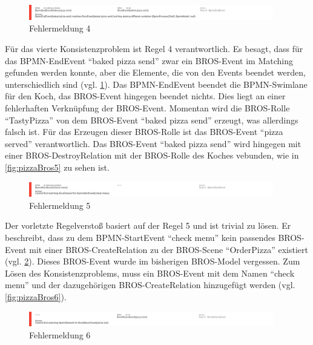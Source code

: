 \begin{figure}[H]
    \centering
    \includegraphics[width=0.95\textwidth,keepaspectratio]{../images/example/error4.png}%
    \caption{Fehlermeldung 4}%
    \label{fig:error4}
\end{figure}

Für das vierte Konsistenzproblem ist Regel 4 verantwortlich.
Es besagt, dass für das BPMN-EndEvent ``baked pizza send'' zwar ein BROS-Event im Matching gefunden werden konnte, aber die Elemente, die von den Events beendet werden, unterschiedlich sind (vgl. \cref{fig:error4}).
Das BPMN-EndEvent beendet die BPMN-Swimlane für den Koch, das BROS-Event hingegen beendet nichts.
Dies liegt an einer fehlerhaften Verknüpfung der BROS-Event.
Momentan wird die BROS-Rolle ``TastyPizza'' von dem BROS-Event ``baked pizza send'' erzeugt, was allerdings falsch ist.
Für das Erzeugen dieser BROS-Rolle ist das BROS-Event ``pizza served'' verantwortlich.
Das BROS-Event ``baked pizza send'' wird hingegen mit einer BROS-DestroyRelation mit der BROS-Rolle des Koches vebunden, wie in \cref{fig:pizzaBros5} zu sehen ist.

\begin{figure}[H]
    \centering
    \includegraphics[width=0.95\textwidth,keepaspectratio]{../images/example/error5.png}%
    \caption{Fehlermeldung 5}%
    \label{fig:error5}
\end{figure}

Der vorletzte Regelverstoß basiert auf der Regel 5 und ist trivial zu lösen.
Er beschreibt, dass zu dem BPMN-StartEvent ``check menu'' kein passendes BROS-Event mit einer BROS-CreateRelation zu der BROS-Scene ``OrderPizza'' existiert (vgl. \cref{fig:error5}).
Dieses BROS-Event wurde im bisherigen BROS-Model vergessen.
Zum Lösen des Konsistenzproblems, muss ein BROS-Event mit dem Namen ``check menu'' und der dazugehörigen BROS-CreateRelation hinzugefügt werden (vgl. \cref{fig:pizzaBros6}).

\begin{figure}[H]
    \centering
    \includegraphics[width=0.95\textwidth,keepaspectratio]{../images/example/error6.png}%
    \caption{Fehlermeldung 6}%
    \label{fig:error6}
\end{figure}

